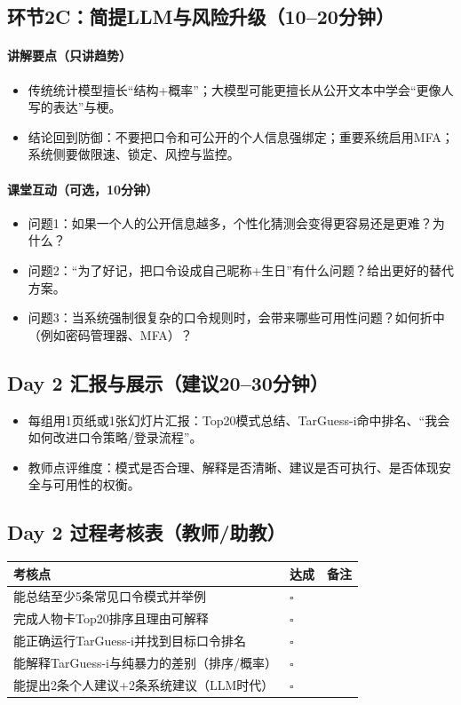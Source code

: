 \documentclass[UTF8,a4paper,12pt]{ctexart}
\begin{document}
\subsection{环节2C：简提LLM与风险升级（10--20分钟）}
\paragraph{讲解要点（只讲趋势）}
\begin{itemize}
  \item 传统统计模型擅长``结构+概率''；大模型可能更擅长从公开文本中学会``更像人写的表达''与梗。
  \item 结论回到防御：不要把口令和可公开的个人信息强绑定；重要系统启用MFA；系统侧要做限速、锁定、风控与监控。
\end{itemize}

\paragraph{课堂互动（可选，10分钟）}
\begin{itemize}
  \item 问题1：如果一个人的公开信息越多，个性化猜测会变得更容易还是更难？为什么？
  \item 问题2：``为了好记，把口令设成自己昵称+生日''有什么问题？给出更好的替代方案。
  \item 问题3：当系统强制很复杂的口令规则时，会带来哪些可用性问题？如何折中（例如密码管理器、MFA）？
\end{itemize}

\subsection{Day 2 汇报与展示（建议20--30分钟）}
\begin{itemize}
  \item 每组用1页纸或1张幻灯片汇报：Top20模式总结、TarGuess-i命中排名、``我会如何改进口令策略/登录流程''。
  \item 教师点评维度：模式是否合理、解释是否清晰、建议是否可执行、是否体现安全与可用性的权衡。
\end{itemize}

\subsection*{Day 2 过程考核表（教师/助教）}
\begin{longtable}{@{}p{}p{}p{}@{}}
\toprule
\textbf{考核点} & \textbf{达成} & \textbf{备注} \\
\midrule
\endhead
能总结至少5条常见口令模式并举例 & $\square$ & \\
完成人物卡Top20排序且理由可解释 & $\square$ & \\
能正确运行TarGuess-i并找到目标口令排名 & $\square$ & \\
能解释TarGuess-i与纯暴力的差别（排序/概率） & $\square$ & \\
能提出2条个人建议+2条系统建议（LLM时代） & $\square$ & \\
\bottomrule
\end{longtable}
\end{document}
